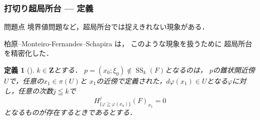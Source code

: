 \documentclass[dvipdfmx,10pt,aspectratio=169,leqno]{beamer}%
\newcommand{\zz}{\mathbf{Z}}
\numberwithin{equation}{subsection}
\newcommand{\muS}[1][]{\mathop{\mathrm{SS}}\nolimits_{#1}}
\theoremstyle{mystyle}
\newtheorem{DFN}[AXM]{定義}
\begin{document}
\begin{frame}\frametitle{打切り超局所台 --- 定義}
    \begin{alertblock}{問題点}
        境界値問題など，超局所台では捉えきれない現象がある．
    \end{alertblock}
    
    柏原--Monteiro-Fernandes--Schapira \cite{KFS03a}は，
    このような現象を扱うために
    超局所台を精密化した．
    \begin{DFN}[{\cite[Definition 3.4]{KFS03a}}]
        \(k\in\zz\)とする．
        \(p=(x_0;\xi_0)\notin \muS[k](F)\)となるのは，
        \(p\)の錐状開近傍\(U\)で，任意の\(x_1\in \pi(U)\)と
        \(x_1\)の近傍で定義された，\(
            d\varphi(x_1)\in U
        \)となる\(\varphi\)に対し，任意の次数\(j\leqq k\)で\[
            H^{j}_{\{\varphi\geqq\varphi(x_0)\}}(F)_{x_1}=0
        \]
        となるものが存在するときであるとする．
    \end{DFN}
\end{frame}
\end{document}
